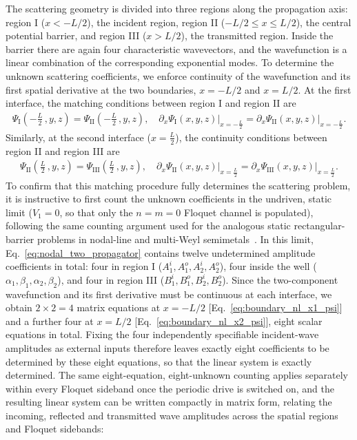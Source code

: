 \documentclass[aps,prb,onecolumn,longbibliography,nofootinbib,citeautoscript,10pt]{revtex4-2}
\begin{document}
The scattering geometry is divided into three regions along the propagation axis: region I ($x < -L/2$), the incident region, region II ($-L/2 \le x \le L/2$), the central potential barrier, and region III ($x > L/2$), the transmitted region. Inside the barrier there are again four characteristic wavevectors, and the wavefunction is a linear combination of the corresponding exponential modes. To determine the unknown scattering coefficients, we enforce continuity of the wavefunction and its first spatial derivative at the two boundaries, $x = -L/2$ and $x = L/2$. At the first interface, the matching conditions between region I and region II are
\begin{align}
\label{eq:boundary_nl_x1_psi}
\Psi_{\text{I}} (-\frac{L} {2} \,,  y, z ) = \Psi_{\text{II}} (-\frac{L} {2} \,,  y, z ), \quad
 \partial_x \Psi_{\text{I}}(x, y, z)  \big |_{x=-\frac{L} {2}} 
=  \partial_x \Psi_{\text{II}}(x, y, z)  \big |_{x=-\frac{L} {2}}.
\end{align}
Similarly, at the second interface ($x = \frac{L} {2}$), the continuity conditions between region II and region III are
\begin{align}
	\label{eq:boundary_nl_x2_psi}
	\Psi_{\text{II}}\left(\frac{L} {2} \,,  y, z\right) = \Psi_{\text{III}}\left(\frac{L} {2} \,,  y, z\right), \quad
	\partial_x \Psi_{\text{II}}(x, y, z)  \big |_{x=\frac{L} {2}} 
	=  \partial_x \Psi_{\text{III}}(x, y, z)  \big |_{x=\frac{L} {2}}.
\end{align}
To confirm that this matching procedure fully determines the scattering problem, it is instructive to first count the unknown coefficients in the undriven, static limit ($V_1=0$, so that only the $n=m=0$ Floquet channel is populated), following the same counting argument used for the analogous static rectangular-barrier problems in nodal-line and multi-Weyl semimetals~\cite{Khokhlov2018,Deng2020,ips-aritra}. In this limit, Eq.~\eqref{eq:nodal_two_propagator} contains twelve undetermined amplitude coefficients in total: four in region I ($A_1^i, A_1^o, A_2^i, A_2^o$), four inside the well ($\alpha_1,\beta_1,\alpha_2,\beta_2$), and four in region III ($B_1^i, B_1^o, B_2^i, B_2^o$). Since the two-component wavefunction and its first derivative must be continuous at each interface, we obtain $2\times2=4$ matrix equations at $x=-L/2$ [Eq.~\eqref{eq:boundary_nl_x1_psi}] and a further four at $x=L/2$ [Eq.~\eqref{eq:boundary_nl_x2_psi}], eight scalar equations in total. Fixing the four independently specifiable incident-wave amplitudes as external inputs therefore leaves exactly eight coefficients to be determined by these eight equations, so that the linear system is exactly determined. The same eight-equation, eight-unknown counting applies separately within every Floquet sideband once the periodic drive is switched on, and the resulting linear system can be written compactly in matrix form, relating the incoming, reflected and transmitted wave amplitudes across the spatial regions and Floquet sidebands:
\end{document}
